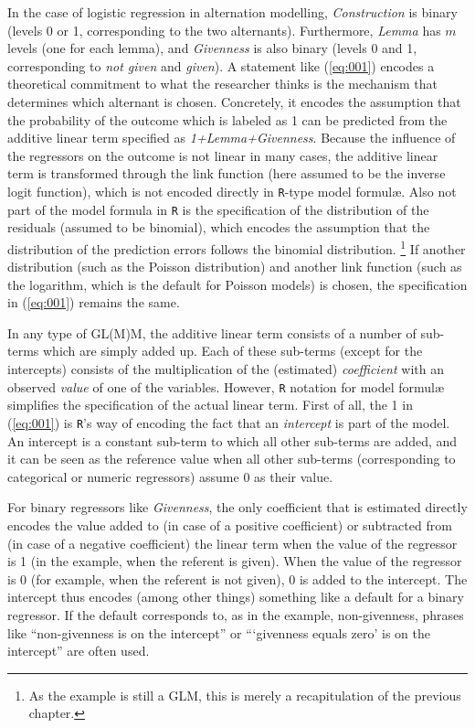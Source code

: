 
In the case of logistic regression in alternation modelling, \textit{Construction} is binary (levels 0 or 1, corresponding to the two alternants).
Furthermore, \textit{Lemma} has $m$ levels (one for each lemma), and \textit{Givenness} is also binary (levels 0 and 1, corresponding to \textit{not given} and \textit{given}).
A statement like (\ref{eq:001}) encodes a theoretical commitment to what the researcher thinks is the mechanism that determines which alternant is chosen.
Concretely, it encodes the assumption that the probability of the outcome which is labeled as 1 can be predicted from the additive linear term specified as \textit{1+Lemma+Givenness}.
Because the influence of the regressors on the outcome is not linear in many cases, the additive linear term is transformed through the link function (here assumed to be the inverse logit function), which is not encoded directly in \texttt{R}-type model formulæ.
Also not part of the model formula in \texttt{R} is the specification of the distribution of the residuals (assumed to be binomial), which encodes the assumption that the distribution of the prediction errors follows the binomial distribution.%
\footnote{As the example is still a GLM, this is merely a recapitulation of the previous chapter.}
If another distribution (such as the Poisson distribution) and another link function (such as the logarithm, which is the default for Poisson models) is chosen, the specification in (\ref{eq:001}) remains the same.

In any type of GL(M)M, the additive linear term consists of a number of sub-terms which are simply added up.
Each of these sub-terms (except for the intercepts) consists of the multiplication of the (estimated) \textit{coefficient} with an observed \textit{value} of one of the variables.
However, \texttt{R} notation for model formulæ simplifies the specification of the actual linear term.
First of all, the 1 in (\ref{eq:001}) is \texttt{R}'s way of encoding the fact that an \textit{intercept} is part of the model.
An intercept is a constant sub-term to which all other sub-terms are added, and it can be seen as the reference value when all other sub-terms (corresponding to categorical or numeric regressors) assume 0 as their value.

For binary regressors like \textit{Givenness}, the only coefficient that is estimated directly encodes the value added to (in case of a positive coefficient) or subtracted from (in case of a negative coefficient) the linear term when the value of the regressor is 1 (in the example, when the referent is given).
When the value of the regressor is 0 (for example, when the referent is not given), 0 is added to the intercept.
The intercept thus encodes (among other things) something like a default for a binary regressor.
If the default corresponds to, as in the example, non-givenness, phrases like ``non-givenness is on the intercept'' or ```givenness equals zero' is on the intercept'' are often used.

